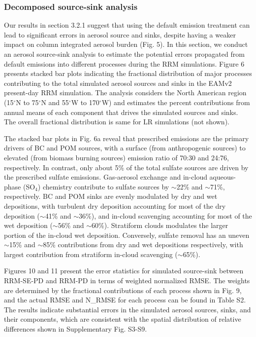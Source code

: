 \subsubsection{Decomposed source-sink analysis}
Our results in section 3.2.1 suggest that using the default emission treatment can lead to significant errors in aerosol source and sinks, despite having a weaker impact on column integrated aerosol burden (Fig. 5). In this section, we conduct an aerosol source-sink analysis to estimate the potential errors propagated from default emissions into different processes during the RRM simulations. Figure 6 presents stacked bar plots indicating the fractional distribution of major processes contributing to the total simulated aerosol sources and sinks in the EAMv2 present-day RRM simulation. The analysis considers the North American region (15$^{\circ}$N to 75$^{\circ}$N and 55$^{\circ}$W to 170$^{\circ}$W) and estimates the percent contributions from annual means of each component that drives the simulated sources and sinks. The overall fractional distribution is same for LR simulations (not shown). 

The stacked bar plots in Fig. 6a reveal that prescribed emissions are the primary drivers of BC and POM sources, with a surface (from anthropogenic sources) to elevated (from biomass burning sources) emission ratio of 70:30 and 24:76, respectively. In contrast, only about 5\% of the total sulfate sources are driven by the prescribed sulfate emissions. Gas-aerosol exchange and in-cloud aqueous-phase (SO$_4$) chemistry contribute to sulfate sources by $\sim$22\% and $\sim$71\%, respectively. BC and POM sinks are evenly modulated by dry and wet depositions, with turbulent dry deposition accounting for most of the dry deposition ($\sim$41\% and $\sim$36\%), and in-cloud scavenging accounting for most of the wet deposition ($\sim$56\% and $\sim$60\%). Stratiform clouds modulates the larger portion of the in-cloud wet deposition. Conversely, sulfate removal has an uneven $\sim$15\% and $\sim$85\% contributions from dry and wet depositions respectively, with largest contribution from stratiform in-cloud scavenging ($\sim$65\%). 

Figures 10 and 11 present the error statistics for simulated source-sink between RRM-SE-PD and RRM-PD in terms of weighted normalized RMSE. The weights are determined by the fractional contributions of each process shown in Fig. 9, and the actual RMSE and N\_RMSE for each process can be found in Table S2. The results indicate substantial errors in the simulated aerosol sources, sinks, and their components, which are consistent with the spatial distribution of relative differences shown in Supplementary Fig. S3-S9.

